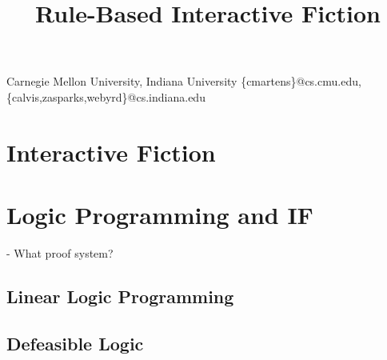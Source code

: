 \documentclass[computermodern]{sigplanconf}
\begin{document}


\title{Rule-Based Interactive Fiction}


           {Carnegie Mellon University, Indiana University}
           {\{cmartens\}@cs.cmu.edu,\{calvis,zasparks,webyrd\}@cs.indiana.edu}

\maketitle

\section{Interactive Fiction}



\section{Logic Programming and IF}



- What proof system?

\subsection{Linear Logic Programming}

\subsection{Defeasible Logic}

\nocite{Covington:1996:PPD:230996}
\nocite{apt03principles}
\nocite{Marriottp98Pwc}

%


\end{document}
